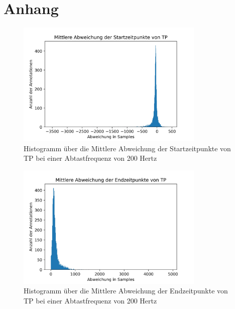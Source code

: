 \chapter{Anhang}\label{chap:Anhang}
\begin{figure}[!ht]%
	\begin{center}
	\includegraphics[width=0.80\textwidth]{./Bilder/LMStartDistribution_means.jpg}
	\end{center}
	\caption{Histogramm über die Mittlere Abweichung der Startzeitpunkte von TP bei einer Abtastfrequenz von 200 Hertz}%
	\label{fig:AASMKrit}%
\end{figure}

\begin{figure}[!ht]%
	\begin{center}
	\includegraphics[width=0.80\textwidth]{./Bilder/LMEndDistribution_means.jpg}
	\end{center}
	\caption{Histogramm über die Mittlere Abweichung der Endzeitpunkte von TP bei einer Abtastfrequenz von 200 Hertz}%
	\label{fig:AASMKrit}%
\end{figure}


